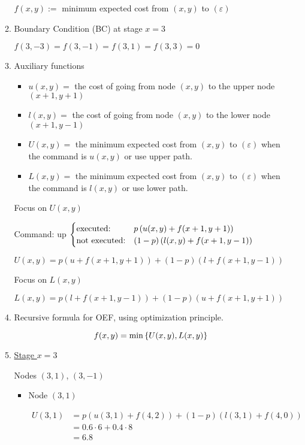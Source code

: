 \begin{prob}
\begin{enumerate}[label = {\textbf{(\greek*)}}]
\begin{sol}
\begin{enumerate}[start = 1, label = {\protect\tsc{$\mathbf{S_{\arabic*}}$}}]
    $f(x,y):=$ minimum expected cost from $(x,y)$ to $(\varepsilon)$
    
    \item Boundary Condition (BC) at stage $x=3$
    
    $f(3,-3)=f(3,-1)=f(3,1)=f(3,3)=0$
    
    \item Auxiliary functions
    
    \begin{itemize}
        \item $u(x,y)=$ the cost of going from node $(x,y)$ to the upper node $(x+1,y+1)$
        
        \item $l(x,y)=$ the cost of going from node $(x,y)$ to the lower node $(x+1,y-1)$
        
        \item $U(x,y)=$ the minimum expected cost from $(x,y)$ to $(\varepsilon)$ when the command is $u(x,y)$ or use upper path.
        
        \item $L(x,y)=$ the minimum expected cost from $(x,y)$ to $(\varepsilon)$ when the command is $l(x,y)$ or use lower path.
    \end{itemize}
    
    Focus on $U(x,y)$
    
    Command: up 
    $\begin{cases} 
    \text{executed:} & p\left(u(x,y)+f(x+1,y+1)\right) \\
    \text{not executed:} & \left(1-p\right)\left(l(x,y)+f(x+1,y-1)\right) 
    \end{cases}$
    
    $U(x,y)=p(u+f(x+1,y+1)) + (1-p)(l+f(x+1,y-1))$
    
    Focus on $L(x,y)$
    
    $L(x,y)=p(l+f(x+1,y-1)) + (1-p)(u+f(x+1,y+1))$
    
    \item Recursive formula for OEF, using optimization principle.
    
    $$f(x,y)=\min\left\{U(x,y),L(x,y)\right\}$$
    
    \item \underline{Stage $x=3$}
    
    Nodes $(3,1)$, $(3,-1)$
     \begin{itemize}
        \item Node $(3,1)$
        
        $\begin{aligned}
            U(3,1) &= p(u(3,1)+f(4,2)) + (1-p)(l(3,1)+f(4,0)) \\
            &= 0.6\cdot6 +0.4\cdot8 \\
            &= 6.8
        \end{aligned}$
        

\end{itemize}
\end{enumerate}
\end{sol}
\end{enumerate}
\end{prob}
